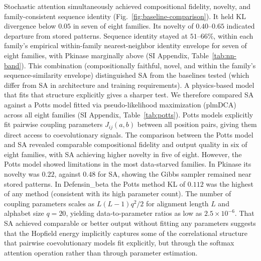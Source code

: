 Stochastic attention simultaneously achieved compositional fidelity, novelty, and family-consistent sequence identity (Fig.~\ref{fig:baseline-comparison}). It held KL divergence below $0.05$ in seven of eight families. Its novelty of $0.40$--$0.65$ indicated departure from stored patterns. Sequence identity stayed at $51$--$66\%$, within each family's empirical within-family nearest-neighbor identity envelope for seven of eight families, with Pkinase marginally above (SI Appendix, Table~\ref{tab:nn-band}). This combination (compositionally faithful, novel, and within the family's sequence-similarity envelope) distinguished SA from the baselines tested (which differ from SA in architecture and training requirements). A physics-based model that fits that structure explicitly gives a sharper test. We therefore compared SA against a Potts model fitted via pseudo-likelihood maximization (plmDCA) across all eight families (SI Appendix, Table~\ref{tab:potts}). Potts models explicitly fit pairwise coupling parameters $J_{ij}(a,b)$ between all position pairs, giving them direct access to coevolutionary signals. The comparison between the Potts model and SA revealed comparable compositional fidelity and output quality in six of eight families, with SA achieving higher novelty in five of eight. However, the Potts model showed limitations in the most data-starved families. In Pkinase its novelty was $0.22$, against $0.48$ for SA, showing the Gibbs sampler remained near stored patterns. In Defensin\_beta the Potts method KL of $0.112$ was the highest of any method (consistent with its high parameter count). The number of coupling parameters scales as $L(L{-}1)q^2/2$ for alignment length $L$ and alphabet size $q{=}20$, yielding data-to-parameter ratios as low as $2.5 \times 10^{-6}$. That SA achieved comparable or better output without fitting any parameters suggests that the Hopfield energy implicitly captures some of the correlational structure that pairwise coevolutionary models fit explicitly, but through the softmax attention operation rather than through parameter estimation.

